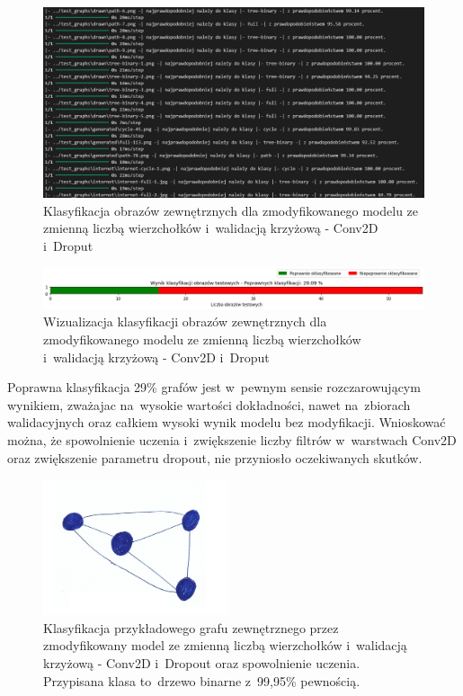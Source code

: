 \begin{figure}[ht]
	\centering
	\includegraphics[width=15.5cm]{resources/tests/images/v4/multiple_edges_crossvalid_1_txt.png}
	\caption{Klasyfikacja obrazów zewnętrznych dla zmodyfikowanego modelu ze zmienną liczbą wierzchołków i~walidacją krzyżową - Conv2D i~Droput}
	\label{Fig:tests-csvar-1b}
\end{figure}
\FloatBarrier

\begin{figure}[ht]
	\centering
	\includegraphics[width=15.5cm]{resources/tests/images/v4/multiple_edges_crossvalid_1_bar.png}
	\caption{Wizualizacja klasyfikacji obrazów zewnętrznych dla zmodyfikowanego modelu ze zmienną liczbą wierzchołków i~walidacją krzyżową - Conv2D i~Droput}
	\label{Fig:tests-csvar-1c}
\end{figure}
\FloatBarrier

Poprawna klasyfikacja 29\% grafów jest w~pewnym sensie rozczarowującym wynikiem,
zważajac na~wysokie wartości dokładności, nawet na~zbiorach walidacyjnych
oraz całkiem wysoki wynik modelu bez modyfikacji.
Wnioskować można, że spowolnienie uczenia i~zwiększenie liczby filtrów w~warstwach Conv2D oraz zwiększenie parametru dropout,
nie przyniosło oczekiwanych skutków.

\begin{figure}[ht]
	\centering
	\includegraphics[height=4cm]{../graph_classification/test_graphs/drawn/full-10.png}
	\caption{Klasyfikacja przykładowego grafu zewnętrznego przez
		zmodyfikowany model ze zmienną liczbą wierzchołków i~walidacją krzyżową - Conv2D i~Dropout oraz spowolnienie uczenia.
		Przypisana klasa to~drzewo binarne z~99,95\% pewnością.}
	\label{Fig:tests-cv-1d}
\end{figure}
\FloatBarrier

